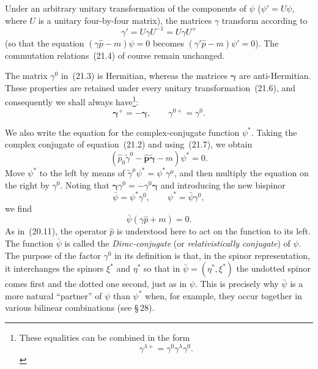Under an arbitrary unitary transformation of the components of $\psi$ ($\psi' = U\psi$, where $U$ is a unitary four-by-four matrix), the matrices $\gamma$ transform according to
\begin{equation}
\gamma' = U\gamma U^{-1} = U\gamma U^+
\tag{21.6}
\end{equation}
(so that the equation $(\gamma\widehat p - m)\psi = 0$ becomes $(\gamma'\widehat p - m)\psi' = 0$). The commutation relations~(21.4) of course remain unchanged.

The matrix $\gamma^0$ in~(21.3) is Hermitian, whereas the matrices $\boldsymbol{\gamma}$ are anti-Hermitian. These properties are retained under every unitary transformation~(21.6), and consequently we shall always have\footnote{These equalities can be combined in the form
\begin{equation}
\gamma^{\lambda+} = \gamma^0\gamma^\lambda\gamma^0.
\tag{21.7\,a}
\end{equation}}:
\begin{equation}
\boldsymbol{\gamma}^+ = -\boldsymbol{\gamma},\qquad \gamma^{0+} = \gamma^0.
\tag{21.7}
\end{equation}

We also write the equation for the complex-conjugate function $\psi^*$. Taking the complex conjugate of equation~(21.2) and using~(21.7), we obtain
\[
(\widehat p_0\widetilde\gamma^0 - \widehat{\mathbf{p}}\widetilde{\boldsymbol{\gamma}} - m)\psi^* = 0.
\]
Move $\psi^*$ to the left by means of $\widetilde\gamma^\mu\psi^* = \psi^*\gamma^\mu$, and then multiply the equation on the right by $\gamma^0$. Noting that $\boldsymbol{\gamma}\gamma^0 = -\gamma^0\boldsymbol{\gamma}$ and introducing the new bispinor
\begin{equation}
\bar\psi = \psi^*\gamma^0,\qquad \psi^* = \bar\psi\gamma^0,
\tag{21.8}
\end{equation}
we find
\begin{equation}
\bar\psi(\gamma\widehat p + m) = 0.
\tag{21.9}
\end{equation}
As in~(20.11), the operator $\widehat p$ is understood here to act on the function to its left. The function $\bar\psi$ is called the \emph{Dirac-conjugate} (or \emph{relativistically conjugate}) of $\psi$. The purpose of the factor $\gamma^0$ in its definition is that, in the spinor representation, it interchanges the spinors $\xi^*$ and $\eta^*$ so that in $\bar\psi = (\eta^*, \xi^*)$ the undotted spinor comes first and the dotted one second, just as in $\psi$. This is precisely why $\bar\psi$ is a more natural ``partner'' of $\psi$ than $\psi^*$ when, for example, they occur together in various bilinear combinations (see \S\,28).

